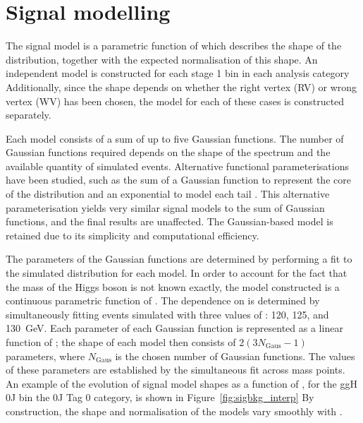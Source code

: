 \section{Signal modelling}

The signal model is a parametric function of \mH which describes the shape of the \mgg distribution, 
together with the expected normalisation of this shape.
An independent model is constructed for each stage 1 bin in each analysis category
Additionally, since the \mgg shape depends on whether the right vertex (RV) 
or wrong vertex (WV) has been chosen, the model for each of these cases is constructed separately.

Each model consists of a sum of up to five Gaussian functions.
The number of Gaussian functions required depends on the shape of the \mgg spectrum 
and the available quantity of simulated events.
Alternative functional parameterisations have been studied, 
such as the sum of a Gaussian function to represent the core of the \mgg distribution 
and an exponential to model each tail \cite{LouieThesis}.
This alternative parameterisation yields very similar signal models to the sum of Gaussian functions, 
and the final results are unaffected.
The Gaussian-based model is retained due to its simplicity and computational efficiency.

The parameters of the Gaussian functions are determined by performing a fit 
to the simulated \mgg distribution for each model.
In order to account for the fact that the mass of the Higgs boson is not known exactly, 
the model constructed is a continuous parametric function of \mH.
The dependence on \mH is determined by simultaneously fitting events simulated with 
three values of \mH: 120, 125, and \SI{130}{GeV}.
Each parameter of each Gaussian function is represented as a linear function of \mH; 
the shape of each model then consists of $2\left(3N_{\textrm{Gaus}}-1\right)$ parameters, 
where $N_{\textrm{Gaus}}$ is the chosen number of Gaussian functions.
The values of these parameters are established by the simultaneous fit across mass points.
An example of the evolution of signal model shapes as a function of \mH, 
for the ggH 0J bin the 0J Tag 0 category, is shown in Figure~\ref{fig:sigbkg_interp}
By construction, the shape and normalisation of the models vary smoothly with \mH.

